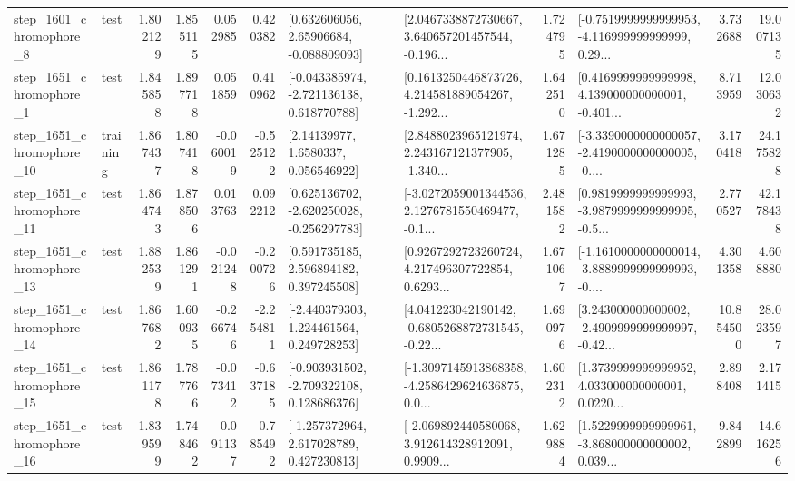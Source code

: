 \begin{tabular}{llrrrrllrlrr}
  step\_1601\_chromophore\_8 &      test &      1.802129 &    1.855115 &      0.052985 &  0.420382 &     [0.632606056, 2.65906684, -0.088809093] &  [2.0467338872730667, 3.640657201457544, -0.196... &       1.724795 &  [-0.7519999999999953, -4.116999999999999, 0.29... &            3.732688 &         19.007135 \\
  step\_1651\_chromophore\_1 &      test &      1.845858 &    1.897718 &      0.051859 &  0.410962 &   [-0.043385974, -2.721136138, 0.618770788] &  [0.1613250446873726, 4.214581889054267, -1.292... &       1.642510 &  [0.4169999999999998, 4.139000000000001, -0.401... &            8.713959 &         12.030632 \\
 step\_1651\_chromophore\_10 &  training &      1.867437 &    1.807418 &     -0.060019 & -0.525122 &        [2.14139977, 1.6580337, 0.056546922] &  [2.8488023965121974, 2.243167121377905, -1.340... &       1.671285 &  [-3.3390000000000057, -2.4190000000000005, -0.... &            3.170418 &         24.175828 \\
 step\_1651\_chromophore\_11 &      test &      1.864743 &    1.878506 &      0.013763 &  0.092212 &   [0.625136702, -2.620250028, -0.256297783] &  [-3.0272059001344536, 2.1276781550469477, -0.1... &       2.481582 &  [0.9819999999999993, -3.9879999999999995, -0.5... &            2.770527 &         42.178438 \\
 step\_1651\_chromophore\_13 &      test &      1.882539 &    1.861291 &     -0.021248 & -0.200726 &     [0.591735185, 2.596894182, 0.397245508] &  [0.9267292723260724, 4.217496307722854, 0.6293... &       1.671067 &  [-1.1610000000000014, -3.8889999999999993, -0.... &            4.301358 &          4.608880 \\
 step\_1651\_chromophore\_14 &      test &      1.867682 &    1.600935 &     -0.266746 & -2.254811 &    [-2.440379303, 1.224461564, 0.249728253] &  [4.041223042190142, -0.6805268872731545, -0.22... &       1.690976 &  [3.243000000000002, -2.4909999999999997, -0.42... &           10.854500 &         28.023597 \\
 step\_1651\_chromophore\_15 &      test &      1.861178 &    1.787766 &     -0.073412 & -0.637185 &   [-0.903931502, -2.709322108, 0.128686376] &  [-1.3097145913868358, -4.2586429624636875, 0.0... &       1.602312 &  [1.3739999999999952, 4.033000000000001, 0.0220... &            2.898408 &          2.171415 \\
 step\_1651\_chromophore\_16 &      test &      1.839599 &    1.748462 &     -0.091137 & -0.785492 &    [-1.257372964, 2.617028789, 0.427230813] &  [-2.069892440580068, 3.912614328912091, 0.9909... &       1.629884 &  [1.5229999999999961, -3.868000000000002, 0.039... &            9.842899 &         14.616256 \\

\end{tabular}
